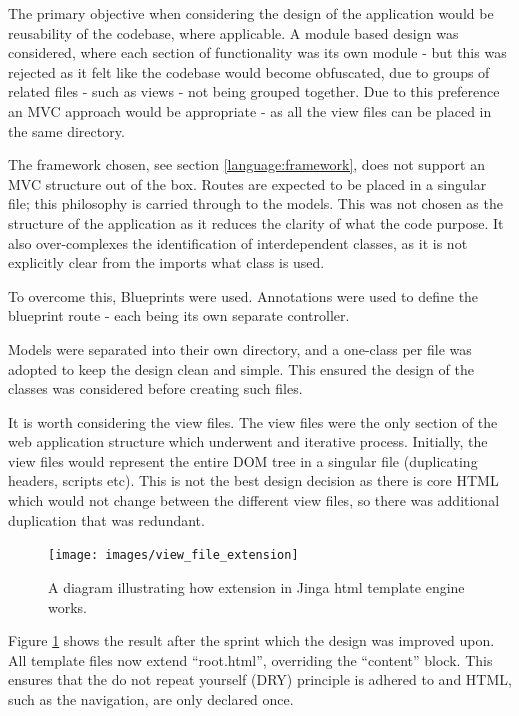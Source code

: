 The primary objective when considering the design of the application would be reusability of the codebase, where applicable. A module based design was considered, where each section of functionality was its own module - but this was rejected as it felt like the codebase would become obfuscated, due to groups of related files - such as views - not being grouped together. Due to this preference an MVC approach would be appropriate - as all the view files can be placed in the same directory.

The framework chosen, see section \ref{language:framework}, does not support an MVC structure out of the box. Routes are expected to be placed in a singular file; this philosophy is carried through to the models. This was not chosen as the structure of the application as it reduces the clarity of what the code purpose. It also over-complexes the identification of interdependent classes, as it is not explicitly clear from the imports what class is used.

To overcome this, Blueprints \cite{citeulike:13983911} were used. Annotations were used to define the blueprint route - each being its own separate controller.

Models were separated into their own directory, and a one-class per file was adopted to keep the design clean and simple. This ensured the design of the classes was considered before creating such files.

It is worth considering the view files. The view files were the only section of the web application structure which underwent and iterative process. Initially, the view files would represent the entire DOM tree in a singular file (duplicating headers, scripts etc). This is not the best design decision as there is core HTML which would not change between the different view files, so there was additional duplication that was redundant.

\begin{figure}[H]
  \centering
  \texttt{[image: images/view\_file\_extension]}
  \caption{A diagram illustrating how extension in Jinga html template engine works.}
  \label{fig:extension}
\end{figure}

Figure \ref{fig:extension} shows the result after the sprint which the design was improved upon. All template files now extend ``root.html'', overriding the ``content'' block. This ensures that the do not repeat yourself (DRY) principle is adhered to and HTML, such as the navigation, are only declared once.

